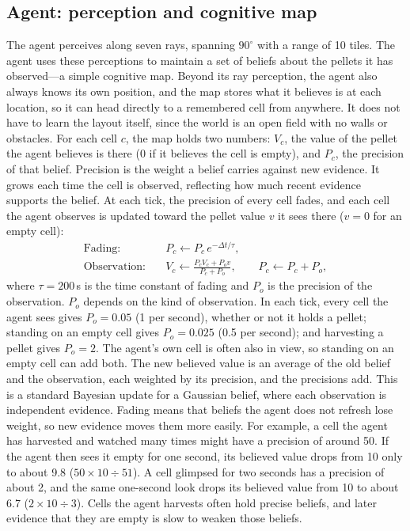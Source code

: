 \documentclass[12pt,fleqn]{article}
\begin{document}
\subsection{Agent: perception and cognitive map}\label{sec:map}

The agent perceives along seven rays, spanning $90^\circ$ with a range of 10 tiles. The agent uses these perceptions to maintain a set of beliefs about the pellets it has observed---a simple cognitive map. Beyond its ray perception, the agent also always knows its own position, and the map stores what it believes is at each location, so it can head directly to a remembered cell from anywhere. It does not have to learn the layout itself, since the world is an open field with no walls or obstacles. For each cell $c$, the map holds two numbers: $V_c$, the value of the pellet the agent believes is there (0 if it believes the cell is empty), and $P_c$, the precision of that belief. Precision is the weight a belief carries against new evidence. It grows each time the cell is observed, reflecting how much recent evidence supports the belief. At each tick, the precision of every cell fades, and each cell the agent observes is updated toward the pellet value $v$ it sees there ($v=0$ for an empty cell):
\begin{equation}\label{eq:belief}
\begin{aligned}
  \text{Fading:}&\quad P_c\leftarrow P_c\,e^{-\Delta t/\tau},\\
  \text{Observation:}&\quad V_c\leftarrow\frac{P_cV_c+P_ov}{P_c+P_o},\qquad P_c\leftarrow P_c+P_o,
\end{aligned}
\end{equation}
where $\tau=200$\,s is the time constant of fading and $P_o$ is the precision of the observation. $P_o$ depends on the kind of observation. In each tick, every cell the agent sees gives $P_o=0.05$ (1 per second), whether or not it holds a pellet; standing on an empty cell gives $P_o=0.025$ (0.5 per second); and harvesting a pellet gives $P_o=2$. The agent's own cell is often also in view, so standing on an empty cell can add both. The new believed value is an average of the old belief and the observation, each weighted by its precision, and the precisions add. This is a standard Bayesian update for a Gaussian belief, where each observation is independent evidence. Fading means that beliefs the agent does not refresh lose weight, so new evidence moves them more easily. For example, a cell the agent has harvested and watched many times might have a precision of around 50. If the agent then sees it empty for one second, its believed value drops from 10 only to about 9.8 ($50\times 10\div51$). A cell glimpsed for two seconds has a precision of about 2, and the same one-second look drops its believed value from 10 to about 6.7 ($2\times10\div3$). Cells the agent harvests often hold precise beliefs, and later evidence that they are empty is slow to weaken those beliefs.
\end{document}
